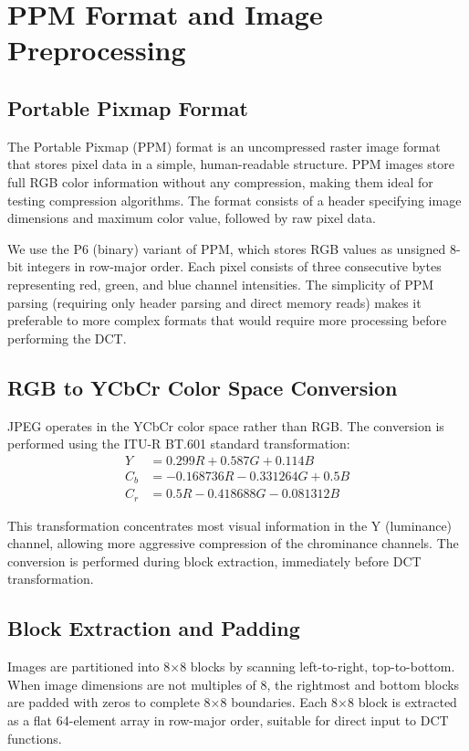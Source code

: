 \documentclass{article}
\begin{document}
\section{PPM Format and Image Preprocessing}

\subsection{Portable Pixmap Format}

The Portable Pixmap (PPM) format is an uncompressed raster image format that stores pixel data in a simple, human-readable structure. PPM images store full RGB color information without any compression, making them ideal for testing compression algorithms. The format consists of a header specifying image dimensions and maximum color value, followed by raw pixel data.

We use the P6 (binary) variant of PPM, which stores RGB values as unsigned 8-bit integers in row-major order. Each pixel consists of three consecutive bytes representing red, green, and blue channel intensities. The simplicity of PPM parsing (requiring only header parsing and direct memory reads) makes it preferable to more complex formats that would require more processing before performing the DCT.

\subsection{RGB to YCbCr Color Space Conversion}

JPEG operates in the YCbCr color space rather than RGB. The conversion is performed using the ITU-R BT.601 standard transformation:
\begin{align}
Y &= 0.299R + 0.587G + 0.114B \\
C_b &= -0.168736R - 0.331264G + 0.5B \\
C_r &= 0.5R - 0.418688G - 0.081312B
\end{align}

This transformation concentrates most visual information in the Y (luminance) channel, allowing more aggressive compression of the chrominance channels. The conversion is performed during block extraction, immediately before DCT transformation.

\subsection{Block Extraction and Padding}

Images are partitioned into 8×8 blocks by scanning left-to-right, top-to-bottom. When image dimensions are not multiples of 8, the rightmost and bottom blocks are padded with zeros to complete 8×8 boundaries. Each 8×8 block is extracted as a flat 64-element array in row-major order, suitable for direct input to DCT functions.
\end{document}
